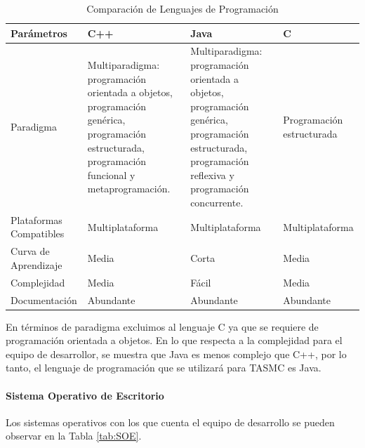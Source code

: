 \begin{table} 
	\begin{center}
		\begin{tabular}{|p{3cm}|p{3cm}|p{3cm}|p{3cm}|}
			\hline \rowcolor[RGB]{51,153,255} 
			\textcolor{blanco}{\bf Parámetros} &
				\textcolor{blanco}{\bf C++} &
				\textcolor{blanco}{\bf Java} &
				\textcolor{blanco}{\bf C} \\
			\hline 
				Paradigma &
				Multiparadigma: programación orientada a objetos, programación genérica, programación estructurada, programación funcional y metaprogramación. &
				Multiparadigma: programación orientada a objetos, programación genérica, programación estructurada, programación reflexiva y programación concurrente. & 
				Programación \newline estructurada \\
      		\hline \rowcolor[RGB]{240,248,255}
      			Plataformas Compatibles &
				Multiplataforma &
				Multiplataforma &
				Multiplataforma \\
      		\hline 
      			Curva de \newline Aprendizaje &
				Media &
				Corta &
				Media \\
      		\hline \rowcolor[RGB]{240,248,255}
      			Complejidad &
				Media &
				Fácil &
				Media \\
      		\hline 
      			Documentación &
				Abundante &
				Abundante &
				Abundante \\
      		\hline 
    		\end{tabular}
	\end{center}
	\caption[Comparación de Lenguajes de Programación]{Comparación de Lenguajes de Programación} 
	\label{tab:lenguProgra}
\end{table}
\newpage
En términos de paradigma excluimos al lenguaje C ya que se requiere de programación orientada a objetos. En lo que respecta a la complejidad para el equipo de desarrollor, se muestra que Java es menos complejo que C++, por lo tanto, el lenguaje de programación que se utilizará para TASMC es Java.

\paragraph{Sistema Operativo de Escritorio}

Los sistemas operativos con los que cuenta el equipo de desarrollo se pueden observar en la Tabla \ref{tab:SOE}.

